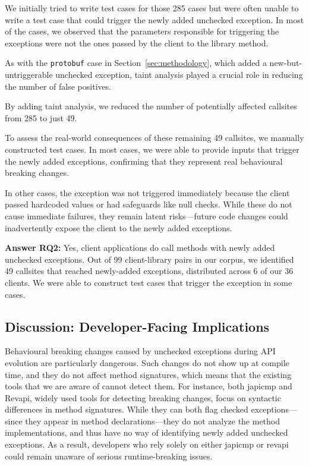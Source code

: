 We initially tried to write test cases for those 285 cases but were often unable to write a test case that could trigger
the newly added unchecked exception. In most of the cases, we observed that the parameters responsible for triggering the 
exceptions were not the ones passed by the client to the library method.

As with the \texttt{protobuf} case in Section~\ref{sec:methodology}, which added a new-but-untriggerable unchecked exception, taint analysis played a crucial role in reducing the number of false positives.

\vspace{1em}
\begin{tcolorbox}[colback=gray!10, colframe=black]
By adding taint analysis, we reduced the number of potentially affected callsites from 285 to just 49.
\end{tcolorbox}
\vspace{1em}

To assess the real-world consequences of these remaining 49 callsites, we manually constructed test cases. In most cases, we were able to provide inputs that trigger the newly added exceptions, confirming that they represent real behavioural breaking changes.

In other cases, the exception was not triggered immediately because the client passed hardcoded values or had safeguards like null checks. While these do not cause immediate failures, they remain latent risks—future code changes could inadvertently expose the client to the newly added exceptions.

\vspace{1em}
\begin{tcolorbox}[colback=gray!10, colframe=black]
\textbf{Answer RQ2:} Yes, client applications do call methods with newly added unchecked exceptions. Out of 99 client-library pairs in our corpus, we identified 49 callsites that reached newly-added exceptions, distributed across 6 of our 36 clients. We were able to construct test cases that trigger the exception in some cases.
\end{tcolorbox}
\vspace{1em}

\subsection{Discussion: Developer-Facing Implications}

Behavioural breaking changes caused by unchecked exceptions during API evolution are particularly dangerous. Such changes do not show up at compile time, and they do not affect method signatures, which means that the existing tools that we are aware of cannot detect them. For instance, both japicmp and Revapi, widely used tools for detecting breaking changes, focus on syntactic differences in method signatures. While they can both flag checked exceptions—since they appear in method declarations—they do not analyze the method implementations, and thus have no way of identifying newly added unchecked exceptions. As a result, developers who rely solely on either japicmp or revapi could remain unaware of serious runtime-breaking issues.

